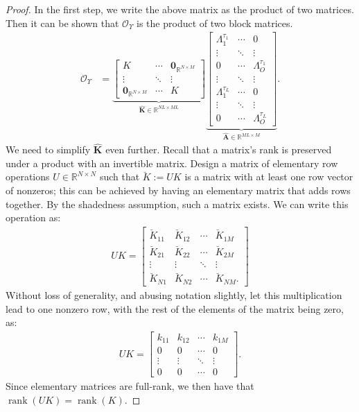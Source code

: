 \documentclass[letterpaper,12pt,peerreviewca,draftcls]{IEEEtran}
\newcommand{\R}{\mathbb{R}}
\newcommand{\kernel}{k}
\newcommand{\empK}{\ensuremath{K}}
\newcommand{\nsamp}{N}
\newcommand{\ncent}{M}
\DeclareMathOperator{\Rank}{rank}
\newcommand{\Obs}{\mathcal{O}}
\newcommand{\otime}{L}
\newcommand{\JorMul}{O}
\newcommand{\Tset}{\Upsilon}
\newcommand{\JorLa}{\Lambda}
\newcommand{\tindex}{\tau}
\newcommand{\transempK}{\breve{\empK}}
\newcommand{\catempK}{\widehat{\mathbf{K}}}
\newcommand{\catdualopC}{\widehat{\mathbf{A}}}
\newcommand{\zerosMat}[2]{\mathbf{0}_{\R^{#1\times#2}}}
\newcommand{\zerosK}{\zerosMat{\nsamp}{\ncent}}
\begin{document}
\begin{proof}
	In the first step, we write the above matrix as the product of two matrices. Then it can be	shown that $\Obs_{\Tset}$ is the product of two block matrices.
	\begin{align*}
	\Obs_{\Tset}  
	&=
	\underbrace{
		\begin{bmatrix}
		\empK   & \cdots & \zerosK\\
		\vdots  & \ddots & \vdots\\
		\zerosK  & \cdots & \empK
		\end{bmatrix}}_{\catempK\in\R^{\nsamp\otime\times\ncent\otime}}
	\underbrace{
		\begin{bmatrix}
		\JorLa_1^{\tindex_1} & \cdots & 0\\
		\vdots & \ddots & \vdots\\
		0 & \cdots & \JorLa_{\JorMul}^{\tindex_1}\\ 
		\hline
		\vdots & \ddots & \vdots\\
		\hline
		\JorLa_1^{\tindex_{\otime}} & \cdots & 0\\
		\vdots & \ddots & \vdots\\
		0 & \cdots & \JorLa_{\JorMul}^{\tindex_\otime}   
		\end{bmatrix}}_{\catdualopC\in\R^{\ncent\otime\times\ncent}}.
	\end{align*}
	We need to simplify $\catempK$ even further. 
	Recall that a matrix's rank is preserved under a product with an invertible matrix. Design a 
	matrix of elementary row operations $U\in\R^{\nsamp\times\nsamp}$ such that $\transempK := U\empK$ is a matrix with at least one row vector of nonzeros; this can be achieved by having an elementary matrix that adds rows together. By the shadedness assumption, such a matrix exists. We can write this operation as:
	\begin{align*}
	U\empK = 
	\begin{bmatrix}
	\transempK_{11} & \transempK_{12} & \cdots & \transempK_{1\ncent}\\
	\transempK_{21} & \transempK_{22} & \cdots & \transempK_{2\ncent}\\
	\vdots & \vdots & \ddots & \vdots\\
	\transempK_{\nsamp1} & \transempK_{\nsamp2} & \cdots & \transempK_{\nsamp\ncent}.
	\end{bmatrix}
	\end{align*}
	Without loss of generality, and abusing notation slightly, let this multiplication lead to one nonzero row, with the rest of the elements of the matrix being zero, as:
	\begin{align*}
	U\empK = 
	\begin{bmatrix}
	\kernel_{11} & \kernel_{12} & \cdots & \kernel_{1\ncent}\\
	0 & 0 & \cdots & 0\\
	\vdots & \vdots & \ddots & \vdots\\
	0 & 0 & \cdots & 0
	\end{bmatrix}.
	\end{align*}
	Since elementary matrices are full-rank, we then have that $\Rank(U\empK) = \Rank(\empK)$. 
	

\end{proof}
\end{document}
